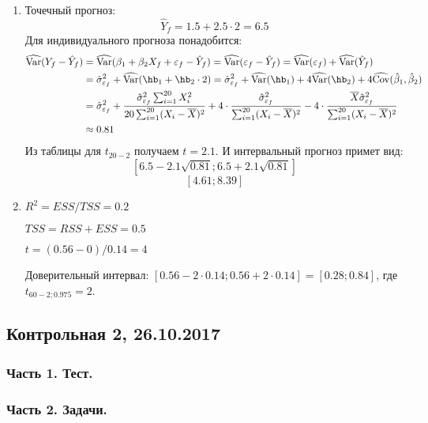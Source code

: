 \begin{enumerate}
\item Точечный прогноз:
\[
\hat Y_f = 1.5 + 2.5 \cdot 2 = 6.5
\]
Для индивидуального прогноза понадобится:
\begin{align*}
\widehat{\Var}(Y_f - \hat Y_f) &= \widehat{\Var}(\beta_1 + \beta_2 X_f + \varepsilon_f - \hat Y_f) = \widehat{\Var}(\varepsilon_f - \hat Y_f) = \widehat{\Var}(\varepsilon_f) + \widehat{\Var}(\hat Y_f) \\
&= \hat\sigma^2_{\varepsilon_f} + \widehat{\Var}(\hb_1 + \hb_2 \cdot 2) = \hat\sigma^2_{\varepsilon_f} + \widehat{\Var}(\hb_1) + 4 \widehat{\Var}(\hb_2) + 4 \widehat{\Cov}(\hat \beta_1, \hat \beta_2) \\
&= \hat\sigma^2_{\varepsilon_f} + \frac{\hat\sigma^2_{\varepsilon_f}\sum_{i=1}^{20} X_i^2}{20\sum_{i=1}^{20}(X_i - \overline X)^2} + 4 \cdot \frac{\hat\sigma^2_{\varepsilon_f}}{\sum_{i=1}^{20}(X_i - \overline X)^2} - 4 \cdot \frac{\overline X \hat\sigma^2_{\varepsilon_f}}{\sum_{i=1}^{20}(X_i - \overline X)^2} \\
&\approx 0.81
\end{align*}
Из таблицы для $t_{20-2}$ получаем  $t = 2.1$. И интервальный прогноз примет вид:
\[
[6.5 - 2.1\sqrt{0.81}; 6.5 + 2.1\sqrt{0.81}]
\]
\[
[4.61; 8.39]
\]
\item $R^2 = ESS / TSS = 0.2$

$TSS = RSS + ESS = 0.5$

$t = (0.56 - 0) / 0.14 = 4$

Доверительный интервал: $[0.56 - 2\cdot 0.14; 0.56 + 2\cdot 0.14] = [0.28; 0.84]$, где $t_{60-2;0.975} = 2$.
\end{enumerate}




\subsection{Контрольная 2, 26.10.2017}



\subsubsection*{Часть 1. Тест.}







\subsubsection*{Часть 2. Задачи.}



